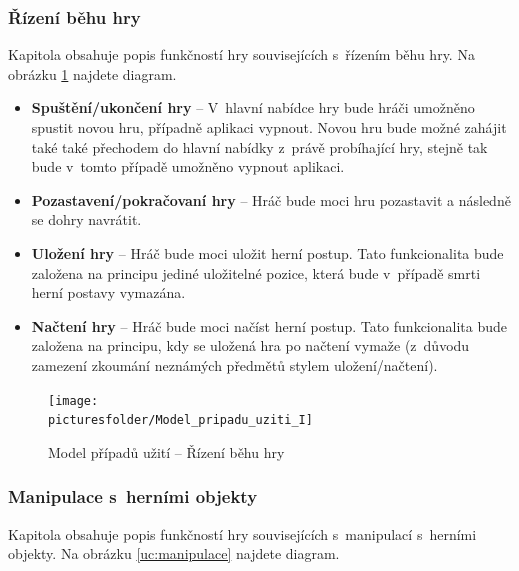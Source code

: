 \documentclass[12pt,a4paper]{article}
\def\picturesfolder{obrazky}
\begin{document}
\subsubsection{Řízení běhu hry}

Kapitola obsahuje popis funkčností hry souvisejících s~řízením běhu hry.
Na obrázku \ref{uc:rizenibehu} najdete diagram.

\begin {itemize}
\item{\textbf{Spuštění/ukončení hry} --  V~hlavní nabídce hry bude hráči
  umožněno spustit novou hru, případně aplikaci vypnout. Novou hru bude možné
  zahájit také také přechodem do hlavní nabídky z~právě probíhající hry, stejně
  tak bude v~tomto případě umožněno vypnout aplikaci.}
\item{\textbf{Pozastavení/pokračovaní hry} --  Hráč bude moci hru pozastavit a
  následně se dohry navrátit.}
\item{\textbf{Uložení hry} --  Hráč bude moci uložit herní postup. Tato
  funkcionalita bude založena na principu jediné uložitelné pozice, která bude
v~případě smrti herní postavy vymazána.}
\item{\textbf{Načtení hry} --  Hráč bude moci načíst herní postup. Tato
  funkcionalita bude založena na principu, kdy se uložená hra po načtení vymaže
  (z~důvodu zamezení zkoumání neznámých předmětů stylem uložení/načtení).}
\end {itemize}

\begin{figure}
\begin{center}
  \texttt{[image: \\picturesfolder/Model\_pripadu\_uziti\_I]}
  \caption{Model případů užití -- Řízení běhu hry}
  \label{uc:rizenibehu}
\end{center}
\end{figure}

\subsubsection{Manipulace s~herními objekty}

Kapitola obsahuje popis funkčností hry souvisejících s~manipulací s~herními
objekty. Na obrázku \ref{uc:manipulace} najdete diagram.
\end{document}
